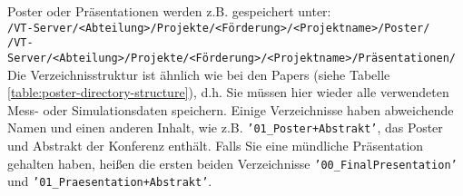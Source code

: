 \begin{table}[!h]
  \caption{%
  Die Daten jedes Beitrags müssen in sieben Unterverzeichnissen gespeichert
  werden; weitere Hinweise: \\
  ** Wenn das Poster präsentiert wurde, lädt der jeweilige Präsentator die
  letzte und überarbeitete Version (d.h. nur die wirklich verwendeten, aber
  absolut vollständigen Daten) in das geschützte Verzeichnis \\
  ***Wenn die in einer Abbildung/Tabelle wiedergegebenen Daten aus verteilten
  Rohdatenverzeichnissen stammt, genügt es, hier nur das erzeugende Programm zu
  speichern%
  }

\label{table:poster-directory-structure}
\end{table}
\noindent Poster oder Präsentationen werden z.B. gespeichert unter: \\
\texttt{/VT-Server/<Abteilung>/Projekte/<Förderung>/<Projektname>/Poster/} \\
\texttt{/VT-Server/<Abteilung>/Projekte/<Förderung>/<Projektname>/Präsentationen/} \\
%
Die Verzeichnisstruktur ist ähnlich wie bei den Papers (siehe Tabelle \ref{table:poster-directory-structure}), d.h. Sie müssen hier
wieder alle verwendeten Mess- oder Simulationsdaten speichern. Einige
Verzeichnisse haben abweichende Namen und einen anderen Inhalt, wie z.B.
\texttt{'01\_Poster+Abstrakt'}, das Poster und Abstrakt der Konferenz enthält.
Falls Sie eine mündliche Präsentation gehalten haben, heißen die ersten beiden
Verzeichnisse \texttt{'00\_FinalPresentation'} und
\texttt{'01\_Praesentation+Abstrakt'}.

